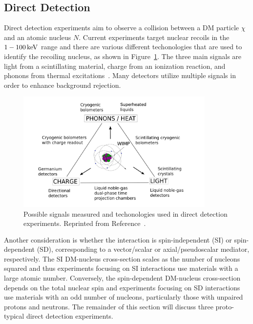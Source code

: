 \subsection{Direct Detection}
\label{sec:dm_direct}

Direct detection experiments aim to observe a collision between a DM particle $\chi$ and an atomic nucleus $N$.
Current experiments target nuclear recoils in the $1-100\,\text{ke\hspace{-.08em}V}$ range and there are various different techonologies that are used to identify the recoiling nucleus, as shown in Figure~\ref{fig:direct_triangle}.
The three main signals are light from a scintillating material, charge from an ionization reaction, and phonons from thermal excitations~\cite{Undagoitia2015}.
Many detectors utilize multiple signals in order to enhance background rejection.

\begin{figure}[htbp]
  \centering
  \includegraphics[width=0.875\textwidth]{DarkMatter/Figures/direct_triangle.png}
  \caption{
    Possible signals measured and techonologies used in direct detection experiments.
    Reprinted from Reference~\cite{Undagoitia2015}.
  }
  \label{fig:direct_triangle}
\end{figure}

Another consideration is whether the interaction is spin-independent (SI) or spin-dependent (SD), corresponding to a vector/scalar or axial/pseudoscalar mediator, respectively. 
The SI DM-nucleus cross-section scales as the number of nucleons squared and thus experiments focusing on SI interactions use materials with a large atomic number.
Conversely, the spin-dependent DM-nucleus cross-section depends on the total nuclear spin and experiments focusing on SD interactions use materials with an odd number of nucleons, particularly those with unpaired protons and neutrons.
The remainder of this section will discuss three proto-typical direct detection experiments.


